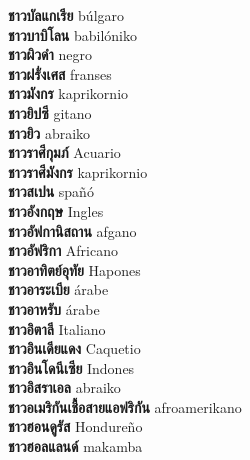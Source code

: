 \textbf{ ชาวบัลแกเรีย  } búlgaro \\
\textbf{ ชาวบาบิโลน  } babilóniko \\
\textbf{ ชาวผิวดำ  } negro \\
\textbf{ ชาวฝรั่งเศส  } franses \\
\textbf{ ชาวมังกร  } kaprikornio \\
\textbf{ ชาวยิปซี  } gitano \\
\textbf{ ชาวยิว  } abraiko \\
\textbf{ ชาวราศีกุมภ์  } Acuario \\
\textbf{ ชาวราศีมังกร  } kaprikornio \\
\textbf{ ชาวสเปน  } spañó \\
\textbf{ ชาวอังกฤษ  } Ingles \\
\textbf{ ชาวอัฟกานิสถาน  } afgano \\
\textbf{ ชาวอัฟริกา  } Africano \\
\textbf{ ชาวอาทิตย์อุทัย  } Hapones \\
\textbf{ ชาวอาระเบีย  } árabe \\
\textbf{ ชาวอาหรับ  } árabe \\
\textbf{ ชาวอิตาลี  } Italiano \\
\textbf{ ชาวอินเดียแดง  } Caquetio \\
\textbf{ ชาวอินโดนีเซีย  } Indones \\
\textbf{ ชาวอิสราเอล  } abraiko \\
\textbf{ ชาวอเมริกันเชื้อสายแอฟริกัน  } afroamerikano \\
\textbf{ ชาวฮอนดูรัส  } Hondureño \\
\textbf{ ชาวฮอลแลนด์  } makamba \\
